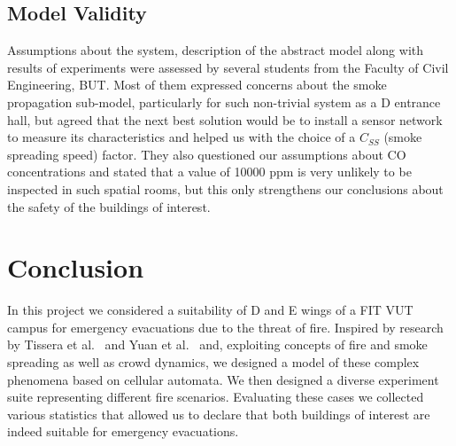 \subsection{Model Validity}
Assumptions about the system, description of the abstract model along with
results of experiments were assessed by several students from the Faculty of
Civil Engineering, BUT.
Most of them expressed concerns about the smoke propagation sub-model,
particularly for such non-trivial system as a D entrance hall, but agreed
that the next best solution would be to install a sensor network to measure
its characteristics and helped us with the choice of a $C_{SS}$
(smoke spreading speed) factor.
They also questioned our assumptions about CO concentrations and stated that
a value of 10000 ppm is very unlikely to be inspected in such spatial rooms,
but this only strengthens our conclusions about the safety of the buildings
of interest.

\section{Conclusion}
In this project we considered a suitability of D and E wings of a FIT VUT campus
for emergency evacuations due to the threat of fire.
Inspired by research by Tissera et al.~\cite{Tissera1, Tissera2} and
Yuan et al.~\cite{Yuan} and, exploiting concepts of fire and smoke spreading as
well as crowd dynamics, we designed a model of these complex phenomena based on
cellular automata.
We then designed a diverse experiment suite representing different fire
scenarios.
Evaluating these cases we collected various statistics that allowed us to
declare that both buildings of interest are indeed suitable for emergency
evacuations.
